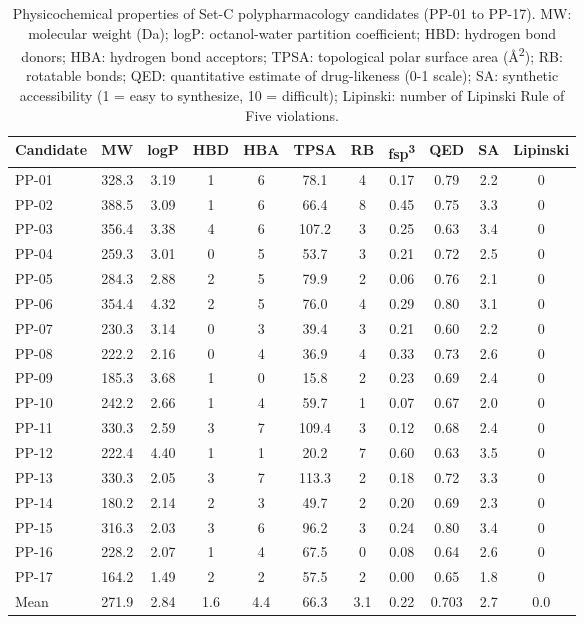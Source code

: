 \begin{table}[h!]
\centering
\caption{Physicochemical properties of Set-C polypharmacology candidates (PP-01 to PP-17). MW: molecular weight (Da); logP: octanol-water partition coefficient; HBD: hydrogen bond donors; HBA: hydrogen bond acceptors; TPSA: topological polar surface area (\si{\angstrom\squared}); RB: rotatable bonds; QED: quantitative estimate of drug-likeness (0-1 scale); SA: synthetic accessibility (1 = easy to synthesize, 10 = difficult); Lipinski: number of Lipinski Rule of Five violations.}
\label{tab:physichem}
\small
\begin{tabular}{lcccccccccc}
\toprule
Candidate & MW & logP & HBD & HBA & TPSA & RB & fsp\textsuperscript{3} & QED & SA & Lipinski \\
\midrule
PP-01 & 328.3 & 3.19 & 1 & 6 & 78.1 & 4 & 0.17 & 0.79 & 2.2 & 0 \\
PP-02 & 388.5 & 3.09 & 1 & 6 & 66.4 & 8 & 0.45 & 0.75 & 3.3 & 0 \\
PP-03 & 356.4 & 3.38 & 4 & 6 & 107.2 & 3 & 0.25 & 0.63 & 3.4 & 0 \\
PP-04 & 259.3 & 3.01 & 0 & 5 & 53.7 & 3 & 0.21 & 0.72 & 2.5 & 0 \\
PP-05 & 284.3 & 2.88 & 2 & 5 & 79.9 & 2 & 0.06 & 0.76 & 2.1 & 0 \\
PP-06 & 354.4 & 4.32 & 2 & 5 & 76.0 & 4 & 0.29 & 0.80 & 3.1 & 0 \\
PP-07 & 230.3 & 3.14 & 0 & 3 & 39.4 & 3 & 0.21 & 0.60 & 2.2 & 0 \\
PP-08 & 222.2 & 2.16 & 0 & 4 & 36.9 & 4 & 0.33 & 0.73 & 2.6 & 0 \\
PP-09 & 185.3 & 3.68 & 1 & 0 & 15.8 & 2 & 0.23 & 0.69 & 2.4 & 0 \\
PP-10 & 242.2 & 2.66 & 1 & 4 & 59.7 & 1 & 0.07 & 0.67 & 2.0 & 0 \\
PP-11 & 330.3 & 2.59 & 3 & 7 & 109.4 & 3 & 0.12 & 0.68 & 2.4 & 0 \\
PP-12 & 222.4 & 4.40 & 1 & 1 & 20.2 & 7 & 0.60 & 0.63 & 3.5 & 0 \\
PP-13 & 330.3 & 2.05 & 3 & 7 & 113.3 & 2 & 0.18 & 0.72 & 3.3 & 0 \\
PP-14 & 180.2 & 2.14 & 2 & 3 & 49.7 & 2 & 0.20 & 0.69 & 2.3 & 0 \\
PP-15 & 316.3 & 2.03 & 3 & 6 & 96.2 & 3 & 0.24 & 0.80 & 3.4 & 0 \\
PP-16 & 228.2 & 2.07 & 1 & 4 & 67.5 & 0 & 0.08 & 0.64 & 2.6 & 0 \\
PP-17 & 164.2 & 1.49 & 2 & 2 & 57.5 & 2 & 0.00 & 0.65 & 1.8 & 0 \\
\midrule
Mean & 271.9 & 2.84 & 1.6 & 4.4 & 66.3 & 3.1 & 0.22 & 0.703 & 2.7 & 0.0 \\
\bottomrule
\end{tabular}
\end{table}